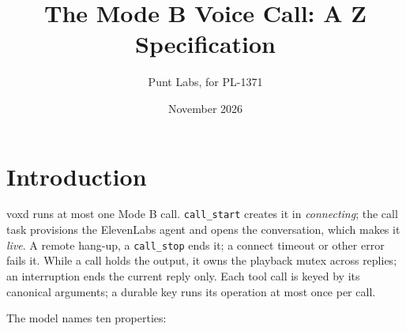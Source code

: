 \documentclass[a4paper,10pt,fleqn]{article}
\begin{document}
\title{The Mode B Voice Call: A Z Specification}
\author{Punt Labs, for PL-1371}
\date{November 2026}
\maketitle

\section{Introduction}

voxd runs at most one Mode B call. \texttt{call\_start} creates it in
\emph{connecting}; the call task provisions the ElevenLabs agent and opens
the conversation, which makes it \emph{live}. A remote hang-up, a
\texttt{call\_stop} ends it; a connect timeout or other error fails it.
While a call holds the output, it owns the playback mutex across replies;
an interruption ends the current reply only. Each tool call is keyed by its
canonical arguments; a durable key runs its operation at most once per call.

The model names ten properties:
\end{document}
